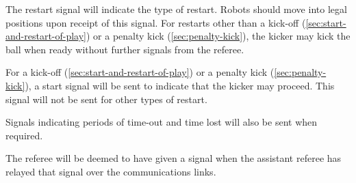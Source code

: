 The restart signal will indicate the type of restart.
Robots should move into legal positions upon receipt of this signal.
For restarts other than a kick-off (\autoref{sec:start-and-restart-of-play}) or a penalty kick (\autoref{sec:penalty-kick}), the kicker may kick the ball when ready without further signals from the referee.

For a kick-off (\autoref{sec:start-and-restart-of-play}) or a penalty kick (\autoref{sec:penalty-kick}), a start signal will be sent to indicate that the kicker may proceed.
This signal will not be sent for other types of restart.

Signals indicating periods of time-out and time lost will also be sent when required.

The referee will be deemed to have given a signal when the assistant referee has relayed that signal over the communications links.

